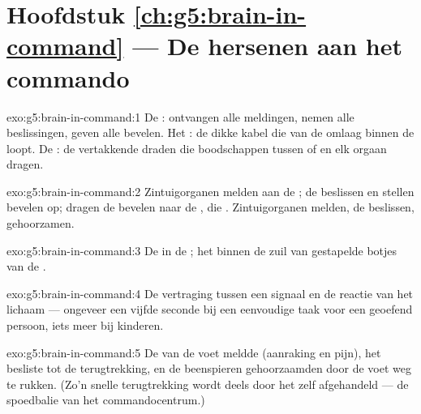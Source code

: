 \section*{Hoofdstuk \ref{ch:g5:brain-in-command} --- De hersenen aan het commando}

\begin{solution}{exo:g5:brain-in-command:1}
De : ontvangen alle meldingen, nemen alle beslissingen, geven
alle bevelen. Het : de dikke kabel die van de  omlaag
binnen de  loopt. De : de vertakkende draden die
boodschappen tussen  of  en elk orgaan dragen.
\end{solution}

\begin{solution}{exo:g5:brain-in-command:2}
Zintuigorganen melden aan de ; de  beslissen en stellen
bevelen op;  dragen de bevelen naar de , die .
Zintuigorganen melden, de  beslissen,  gehoorzamen.
\end{solution}

\begin{solution}{exo:g5:brain-in-command:3}
De  in de ; het  binnen de zuil van gestapelde
botjes van de .
\end{solution}

\begin{solution}{exo:g5:brain-in-command:4}
De vertraging tussen een signaal en de reactie van het lichaam ---
ongeveer een vijfde seconde bij een eenvoudige taak voor een geoefend
persoon, iets meer bij kinderen.
\end{solution}

\begin{solution}{exo:g5:brain-in-command:5}
De  van de voet meldde (aanraking en pijn), het  besliste
tot de terugtrekking, en de beenspieren gehoorzaamden door de voet weg te
rukken. (Zo'n snelle terugtrekking wordt deels door het  zelf
afgehandeld --- de spoedbalie van het commandocentrum.)
\end{solution}

